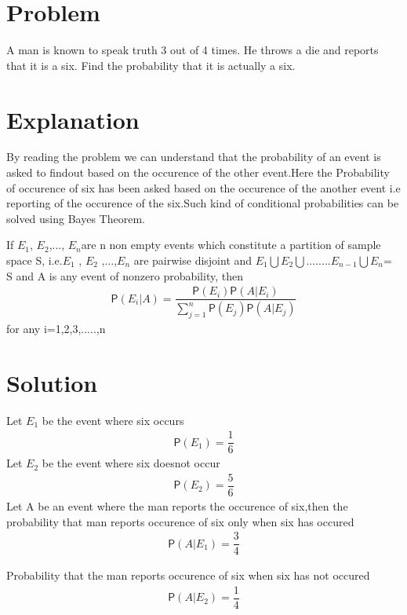 \documentclass[journal,12pt,twocolumn]{IEEEtran}
\newcommand*{\prob}{\mathsf{P}}
\begin{document}
\section{Problem}
A man is known to speak truth 3 out of 4 times. He throws a die and reports that it is a six. Find the probability that it is actually a six.

\section{Explanation}
By reading the problem we can understand that the probability of an event is asked to findout based on the occurence of the other event.Here the Probability of occurence of six has been asked based on the occurence of the another event i.e reporting of the occurence of the six.Such kind of conditional probabilities can be solved using Bayes Theorem.
\begin{theorem}
 If $E_{1}$, $E_{2}$,..., $E_{n}$are n non empty events which constitute a partition of sample space S, i.e.$E_{1}$ , $E_{2}$ ,...,$E_{n}$  are pairwise disjoint and $E_{1} \bigcup E_{2} \bigcup ........E_{n-1} \bigcup E_{n}$= S and A is any event of nonzero probability, then \begin{align}\label{bayes}
\prob(E_{i}|A) = \dfrac{\prob(E_{i}) \prob(A|E_{i})}{ \sum_{j=1}^{n} \prob(E_{j}) \prob(A|E_{j})}  
 \end{align}
 for any i=1,2,3,.....,n
 \end{theorem}
 
\section{Solution}
Let $E_{1}$ be the event where six occurs
\begin{align}\label{1}
\prob(E_{1})=\dfrac{1}{6}
\end{align}
Let $E_{2}$ be the event where six doesnot occur
\begin{align}\label{2}
\prob(E_{2})=\dfrac{5}{6}
\end{align}
Let A be an event where the man reports the occurence of six,then the probability that man reports occurence of six only when six has occured \begin{align}\label{3}
\prob({A|E_{1}})=\dfrac{3}{4}
\end{align}

Probability that the man reports occurence of six  when six has not occured \begin{align}\label{4}
\prob({A|E_{2}})=\dfrac{1}{4}
\end{align}
\end{document}
